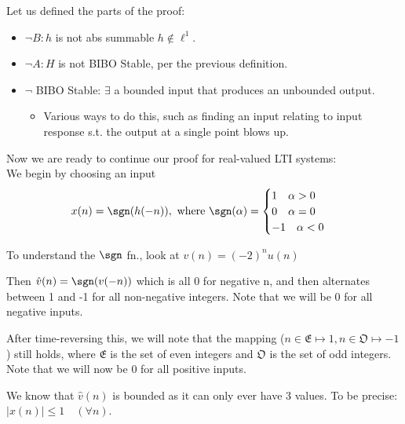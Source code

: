 Let us defined the parts of the proof:
\begin{itemize}
    \item $\lnot B: h$ is not abs summable $h\not\in\ell^1$.
    \item $\lnot A: H$ is not BIBO Stable, per the previous definition.
    \item $\lnot $ BIBO Stable: $\exists$ a bounded input that produces an unbounded output.
    \begin{itemize}
        \item Various ways to do this, such as finding an input relating to input response s.t. the output at a single point blows up.
    \end{itemize}
\end{itemize}

Now we are ready to continue our proof for real-valued LTI systems:\\
We begin by choosing an input
\[
    x(n) = \sgn(h(-n)), \text{ where } \sgn(\alpha) = \begin{cases} 1\quad\alpha>0 \\ 0\quad\alpha=0 \\ -1\quad\alpha<0 \end{cases}
\]

\begin{shaded}
To understand the $\sgn$ fn., look at $v(n) = (-2)^n u(n)$

Then $\hat v(n) = \sgn(v(-n))$ which is all 0 for negative n, and then alternates between 1 and -1 for all non-negative integers. Note that we will be 0 for all negative inputs.

After time-reversing this, we will note that the mapping ($n\in\mathfrak E\mapsto 1, n\in\mathfrak O\mapsto -1$) still holds, where $\mathfrak E$ is the set of even integers and $\mathfrak O$ is the set of odd integers. Note that we will now be 0 for all positive inputs.

We know that $\hat v(n)$ is bounded as it can only ever have 3 values. To be precise: $|x(n)|\le1\quad(\forall n)$.
\end{shaded}

